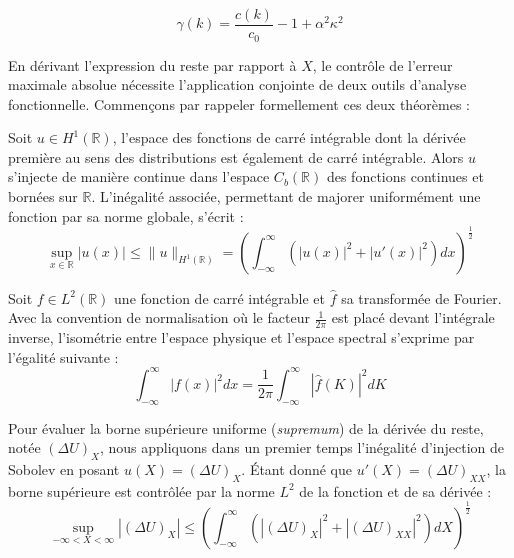 \[
    \gamma(k) = \frac{c(k)}{c_0} -1 + \alpha^2 \kappa^2
\]


En dérivant l'expression du reste par rapport à $X$, le contrôle de l'erreur maximale absolue nécessite l'application conjointe de deux outils d'analyse fonctionnelle. Commençons par rappeler formellement ces deux théorèmes :

\begin{theorembox}
\begin{theorem}
Soit $u \in H^1(\mathbb{R})$, l'espace des fonctions de carré intégrable dont la dérivée première au sens des distributions est également de carré intégrable. Alors $u$ s'injecte de manière continue dans l'espace $C_b(\mathbb{R})$ des fonctions continues et bornées sur $\mathbb{R}$. L'inégalité associée, permettant de majorer uniformément une fonction par sa norme globale, s'écrit :
\[
\sup_{x \in \mathbb{R}} |u(x)| \le \|u\|_{H^1(\mathbb{R})} = \left( \int_{-\infty}^{\infty} \left( |u(x)|^2 + |u'(x)|^2 \right) dx \right)^{\frac{1}{2}}
\]
\end{theorem}
\end{theorembox}

\begin{theorembox}
\begin{theorem}
Soit $f \in L^2(\mathbb{R})$ une fonction de carré intégrable et $\hat{f}$ sa transformée de Fourier. Avec la convention de normalisation où le facteur $\frac{1}{2\pi}$ est placé devant l'intégrale inverse, l'isométrie entre l'espace physique et l'espace spectral s'exprime par l'égalité suivante :
\[
\int_{-\infty}^{\infty} |f(x)|^2 dx = \frac{1}{2\pi} \int_{-\infty}^{\infty} |\hat{f}(K)|^2 dK
\]
\end{theorem}
\end{theorembox}
Pour évaluer la borne supérieure uniforme (\textit{supremum}) de la dérivée du reste, notée $(\Delta U)_X$, nous appliquons dans un premier temps l'inégalité d'injection de Sobolev en posant $u(X) = (\Delta U)_X$. Étant donné que $u'(X) = (\Delta U)_{XX}$, la borne supérieure est contrôlée par la norme $L^2$ de la fonction et de sa dérivée :
\begin{equation}
\sup_{-\infty<X<\infty}|(\Delta U)_{X}| \le \left( \int_{-\infty}^{\infty} \left( |(\Delta U)_X|^2 + |(\Delta U)_{XX}|^2 \right) dX \right)^{\frac{1}{2}}
\end{equation}

